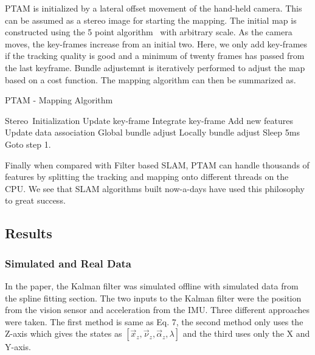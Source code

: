 PTAM is initialized by a lateral offset movement of the hand-held camera. This can be assumed as a stereo image for starting the mapping. The initial map is constructed using the 5 point algorithm~\cite{nister2004efficient} with arbitrary scale. As the camera moves, the key-frames increase from an initial two. Here, we only add key-frames if the tracking quality is good and a minimum of twenty frames has passed from the last keyframe. Bundle adjustemnt is iteratively performed to adjust the map based on a cost function. The mapping algorithm can then be summarized as.

\begin{algorithm}
    \caption{PTAM - Mapping Algorithm}
	\begin{algorithmic}[1]
		\REQUIRE \mbox{Stereo Initialization}
			\STATE Update key-frame
			\STATE Integrate key-frame
			\STATE Add new features
				\STATE Update data association
			\ELSE
				\STATE Global bundle adjust
			\ENDIF
		\ELSE
			\STATE Locally bundle adjust
		\ENDIF
		\STATE Sleep 5ms
		\STATE Goto step 1.
	\end{algorithmic}
\end{algorithm}

Finally when compared with Filter based SLAM, PTAM can handle thousands of features by splitting the tracking and mapping onto different threads on the CPU. We see that SLAM algorithms built now-a-days have used this philosophy to great success. 

\subsection{Results}
\subsubsection{Simulated and Real Data}

In the paper, the Kalman filter was simulated offline with simulated data from the spline fitting section. The two inputs to the Kalman filter were the position from the vision sensor and acceleration from the IMU. Three different approaches were taken. The first method is same as Eq. 7, the second method only uses the Z-axis which gives the states as $[\overrightarrow{x}_z, \overrightarrow{\nu}_z, \overrightarrow{\alpha}_z, \lambda]$ and the third uses only the X and Y-axis. 

